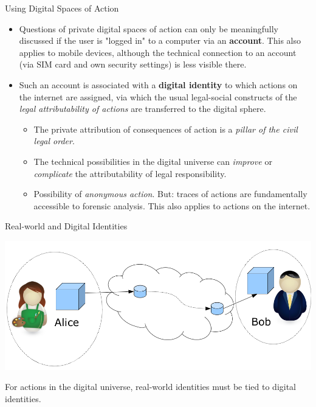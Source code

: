 \documentclass{beamer}
\begin{document}
\begin{frame}{Using Digital Spaces of Action}  
\begin{itemize}
\item Questions of private digital spaces of action can only be meaningfully
  discussed if the user is "logged in" to a computer via an \textbf{account}.
  This also applies to mobile devices, although the technical connection to an
  account (via SIM card and own security settings) is less visible there.
\item Such an account is associated with a \textbf{digital identity} to which
  actions on the internet are assigned, via which the usual legal-social
  constructs of the \emph{legal attributability of actions} are transferred to
  the digital sphere.  
  \begin{itemize}
  \item The private attribution of consequences of action is a \emph{pillar of
    the civil legal order}.
  \item The technical possibilities in the digital universe can \emph{improve}
    or \emph{complicate} the attributability of legal responsibility.
  \item Possibility of \emph{anonymous action}. But: traces of actions are
    fundamentally accessible to forensic analysis. This also applies to
    actions on the internet.
  \end{itemize}
\end{itemize}
\end{frame}
\begin{frame}{Real-world and Digital Identities}
  \begin{center}
    \includegraphics[width=.9\textwidth]{DI-4.png}
  \end{center}
  For actions in the digital universe, real-world identities must be tied to
  digital identities.
\end{frame}
\end{document}
